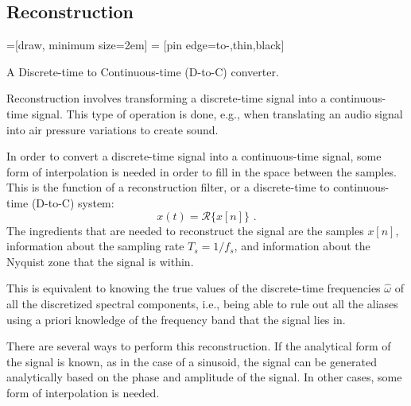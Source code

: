 \subsection{Reconstruction}
\begin{marginfigure}
  =[draw, minimum size=2em]
   = [pin edge={to-,thin,black}]
  \begin{center}
  \end{center}
  \caption{A Discrete-time to Continuous-time (D-to-C) converter.}
\end{marginfigure}

Reconstruction involves transforming a discrete-time signal into a continuous-time signal. 
This type of operation is done, e.g., when
translating an audio signal into air pressure variations to create sound.

In order to convert a discrete-time signal into a continuous-time signal, some form 
of interpolation is needed in order to fill in the space between the samples. 
This is the function of a reconstruction filter, or a discrete-time to continuous-time (D-to-C) system:
\begin{equation}
  x(t) = \mathcal{R}\{x[n]\}\,\,.
\end{equation}
The ingredients that are needed to reconstruct the signal are the samples $x[n]$, information about the
sampling rate $T_s=1/f_s$, and information about the Nyquist zone that the signal is within.

This is equivalent to knowing the true values of the discrete-time frequencies $\hat{\omega}$ of all the discretized spectral
components, i.e., being able to rule out all the aliases using a priori knowledge of the frequency band that the signal lies in.

There are several ways to perform this reconstruction. If the analytical form of the signal is 
known, as in the case of a sinusoid, the signal can be generated analytically based on the 
phase and amplitude of the signal. In other cases, some form of interpolation is needed.

